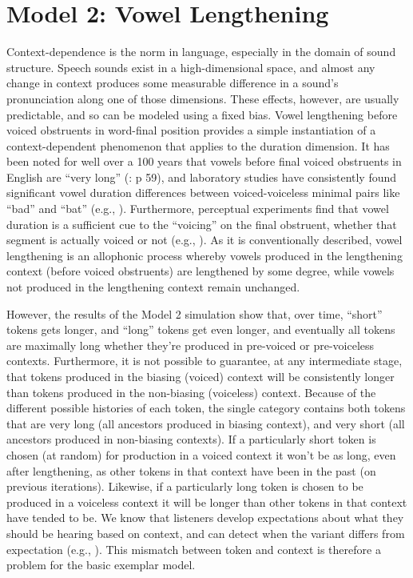 \section{\label{subsec:Model-2:-Lengthening}Model 2: Vowel Lengthening}

Context-dependence is the norm in language, especially in the domain
of sound structure. Speech sounds exist in a high-dimensional space,
and almost any change in context produces some measurable difference
in a sound's pronunciation along one of those dimensions. These effects,
however, are usually predictable, and so can be modeled using a fixed
bias. Vowel lengthening before voiced obstruents in word-final position
provides a simple instantiation of a context-dependent phenomenon
that applies to the duration dimension. It has been noted for well
over a 100 years that vowels before final voiced obstruents in English
are “very long” (\citealt{Sweet1880}: p 59), and laboratory
studies have consistently found significant vowel duration differences
between voiced-voiceless minimal pairs like “bad” and “bat”
(e.g., \citealt{peterson1960duration,chen1970vowel}). Furthermore,
perceptual experiments find that vowel duration is a sufficient cue
to the “voicing” on the final obstruent, whether that segment
is actually voiced or not (e.g., \citealt{raphael1972preceding,Klatt1976}).
As it is conventionally described, vowel lengthening is an allophonic
process whereby vowels produced in the lengthening context (before
voiced obstruents) are lengthened by some degree, while vowels not
produced in the lengthening context remain unchanged.

However, the results of the Model 2 simulation show that, over time,
“short” tokens gets longer, and “long” tokens get even
longer, and eventually all tokens are maximally long whether they're
produced in pre-voiced or pre-voiceless contexts. Furthermore, it
is not possible to guarantee, at any intermediate stage, that tokens
produced in the biasing (voiced) context will be consistently longer
than tokens produced in the non-biasing (voiceless) context. Because
of the different possible histories of each token, the single category
contains both tokens that are very long (all ancestors produced in
biasing context), and very short (all ancestors produced in non-biasing
contexts). If a particularly short token is chosen (at random) for
production in a voiced context it won't be as long, even after lengthening,
as other tokens in that context have been in the past (on previous
iterations). Likewise, if a particularly long token is chosen to be
produced in a voiceless context it will be longer than other tokens
in that context have tended to be. We know that listeners develop
expectations about what they should be hearing based on context, and
can detect when the variant differs from expectation (e.g., \citealp{krakow1988coarticulatory,gaskell1996phonological}).
This mismatch between token and context is therefore a problem for
the basic exemplar model. 

